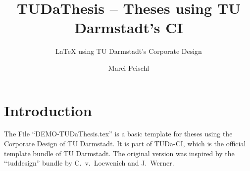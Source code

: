 \documentclass[
	english,%
	ruledheaders=section,%
	class=report,%
	thesis={type=bachelor},%
	accentcolor=9c,%
	custommargins=true,%
	marginpar=false,%
	parskip=half-,%
	fontsize=11pt,%
]{tudapub}
\begin{document}
\title{TUDaThesis -- Theses using TU Darmstadt's CI}
\subtitle{\LaTeX{} using TU Darmstadt's Corporate Design}
\author{Marei Peischl}



\submissiondate{\today}
\examdate{\today}


\maketitle

\tableofcontents


\chapter{Introduction}
The File \enquote{DEMO-TUDaThesis.tex} is a basic template for theses using the Corporate Design of TU Darmstadt. It is part of TUDa-CI, which is the official template bundle of TU Darmstadt. The original version was inspired by the \enquote{tuddesign} bundle by C.~v.~Loewenich and J.~Werner.



\printbibliography
\end{document}
